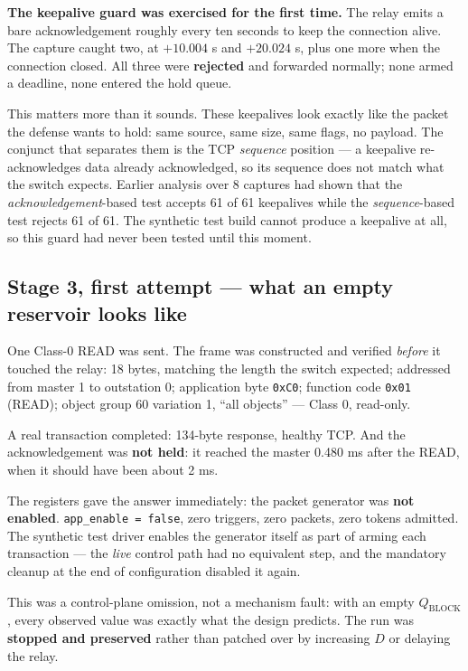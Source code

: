 \documentclass[10pt,a4paper,oneside]{article}
\newcommand{\num}[1]{\mbox{#1}}
\newcommand{\code}[1]{\texttt{\small #1}}
\begin{document}
\textbf{The keepalive guard was exercised for the first time.} The relay emits a bare
acknowledgement roughly every ten seconds to keep the connection alive. The capture caught
two, at $+\num{10.004}$ s and $+\num{20.024}$ s, plus one more when the connection closed.
All three were \textbf{rejected} and forwarded normally; none armed a deadline, none entered
the hold queue.

This matters more than it sounds. These keepalives look exactly like the packet the defense
wants to hold: same source, same size, same flags, no payload. The conjunct that separates
them is the TCP \emph{sequence} position --- a keepalive re-acknowledges data already
acknowledged, so its sequence does not match what the switch expects. Earlier analysis over
8 captures had shown that the \emph{acknowledgement}-based test accepts 61 of 61 keepalives
while the \emph{sequence}-based test rejects 61 of 61. The synthetic test build cannot
produce a keepalive at all, so this guard had never been tested until this moment.

\subsection{Stage 3, first attempt --- what an empty reservoir looks like}

One Class-0 READ was sent. The frame was constructed and verified \emph{before} it touched
the relay: 18 bytes, matching the length the switch expected; addressed from master 1 to
outstation 0; application byte \code{0xC0}; function code \code{0x01} (READ); object group
60 variation 1, ``all objects'' --- Class 0, read-only.

A real transaction completed: 134-byte response, healthy TCP. And the acknowledgement was
\textbf{not held}: it reached the master \num{0.480} ms after the READ, when it should have
been about 2 ms.

The registers gave the answer immediately: the packet generator was \textbf{not enabled}.
\code{app\_enable = false}, zero triggers, zero packets, zero tokens admitted. The synthetic
test driver enables the generator itself as part of arming each transaction --- the
\emph{live} control path had no equivalent step, and the mandatory cleanup at the end of
configuration disabled it again.

This was a control-plane omission, not a mechanism fault: with an empty
$Q_{\mathrm{BLOCK}}$, every observed value was exactly what the design predicts. The run was
\textbf{stopped and preserved} rather than patched over by increasing $D$ or delaying the
relay.
\end{document}
